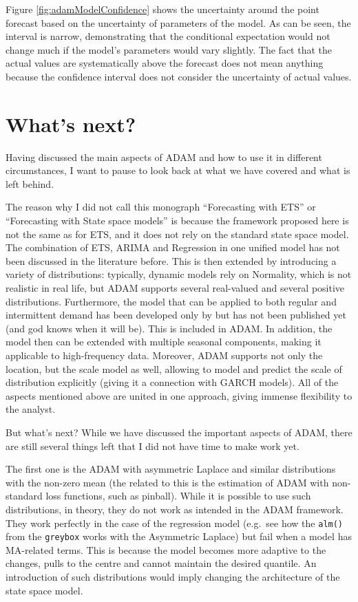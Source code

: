 \documentclass[
]{book}
\theoremstyle{definition}
\theoremstyle{definition}
\theoremstyle{definition}
\theoremstyle{definition}
\theoremstyle{remark}
\begin{document}
Figure \ref{fig:adamModelConfidence} shows the uncertainty around the point forecast based on the uncertainty of parameters of the model. As can be seen, the interval is narrow, demonstrating that the conditional expectation would not change much if the model's parameters would vary slightly. The fact that the actual values are systematically above the forecast does not mean anything because the confidence interval does not consider the uncertainty of actual values.

\hypertarget{conclusions}{%
\chapter{What's next?}\label{conclusions}}

Having discussed the main aspects of ADAM and how to use it in different circumstances, I want to pause to look back at what we have covered and what is left behind.

The reason why I did not call this monograph ``Forecasting with ETS'' or ``Forecasting with State space models'' is because the framework proposed here is not the same as for ETS, and it does not rely on the standard state space model. The combination of ETS, ARIMA and Regression in one unified model has not been discussed in the literature before. This is then extended by introducing a variety of distributions: typically, dynamic models rely on Normality, which is not realistic in real life, but ADAM supports several real-valued and several positive distributions. Furthermore, the model that can be applied to both regular and intermittent demand has been developed only by \citet{Svetunkov2019a} but has not been published yet (and god knows when it will be). This is included in ADAM. In addition, the model then can be extended with multiple seasonal components, making it applicable to high-frequency data. Moreover, ADAM supports not only the location, but the scale model as well, allowing to model and predict the scale of distribution explicitly (giving it a connection with GARCH models). All of the aspects mentioned above are united in one approach, giving immense flexibility to the analyst.

But what's next? While we have discussed the important aspects of ADAM, there are still several things left that I did not have time to make work yet.

The first one is the ADAM with asymmetric Laplace and similar distributions with the non-zero mean (the related to this is the estimation of ADAM with non-standard loss functions, such as pinball). While it is possible to use such distributions, in theory, they do not work as intended in the ADAM framework. They work perfectly in the case of the regression model (e.g.~see how the \texttt{alm()} from the \texttt{greybox} works with the Asymmetric Laplace) but fail when a model has MA-related terms. This is because the model becomes more adaptive to the changes, pulls to the centre and cannot maintain the desired quantile. An introduction of such distributions would imply changing the architecture of the state space model.
\end{document}
